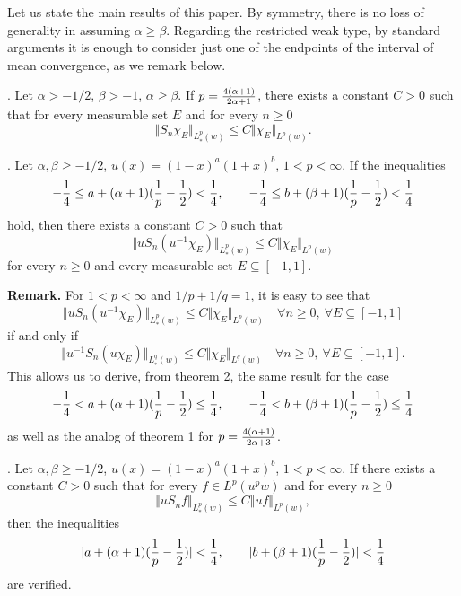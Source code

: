 Let us state the main results of this paper. By symmetry, there is no loss of
generality in assuming $\alpha \geq \beta$. Regarding the restricted weak
type, by standard arguments it is enough to consider just one of the endpoints
of the interval of mean convergence, as we remark below.

. Let $\alpha > -1/2$, $\beta > -1$, $\alpha \geq \beta$. If
$p = {4(\alpha+1) \over 2\alpha+1}$, there exists a constant $C>0$ such that
for every measurable set $E$ and for every $n \geq 0$
$$
   \Vert S_n\chi_E \Vert _{L^p_*(w)} \leq	 C \Vert \chi_E \Vert _{L^p(w)}.
$$

\medskip

. Let $\alpha, \beta \geq -1/2$, $u(x)=(1-x)^a(1+x)^b$,
$1<p<\infty$. If the inequalities
$$
   -{1 \over 4} \leq a+(\alpha+1)({1 \over p}-{1 \over 2}) < {1 \over 4},
   \qquad
   -{1 \over 4} \leq b+(\beta+1)({1 \over p}-{1 \over 2}) < {1 \over 4}
$$
hold, then there exists a constant $C>0$ such that
$$
   \Vert uS_n(u^{-1}\chi_E) \Vert _{L^p_*(w)}
   \leq C \Vert \chi_E \Vert _{L^p(w)}
$$
for every $n \geq 0$ and every measurable set $E \subseteq [-1,1]$.

\medskip

{\noindent\bf Remark.} For $1<p<\infty$ and $1/p+1/q=1$, it is easy to see that
$$
   \Vert uS_n(u^{-1}\chi_E) \Vert _{L^p_*(w)}
   \leq C \Vert \chi_E \Vert _{L^p(w)}
   \quad \forall n\geq 0, \ \forall E \subseteq [-1,1]
$$
if and only if
$$
   \Vert u^{-1}S_n(u\chi_E) \Vert _{L^q_*(w)}
   \leq C \Vert \chi_E \Vert _{L^q(w)}
   \quad \forall n\geq 0, \ \forall E \subseteq [-1,1].
$$
This allows us to derive, from theorem 2, the same result for the case
$$
   -{1 \over 4} < a+(\alpha+1)({1 \over p}-{1 \over 2}) \leq {1 \over 4},
   \qquad
   -{1 \over 4} < b+(\beta+1)({1 \over p}-{1 \over 2}) \leq {1 \over 4}
$$
as well as the analog of theorem 1 for $p={4(\alpha+1) \over 2\alpha+3}$.

\medskip

. Let $\alpha, \beta \geq -1/2$, $u(x)=(1-x)^a(1+x)^b$,
$1<p<\infty$. If there exists a constant $C>0$ such that for every $f \in
L^p(u^pw)$ and for every $n \geq 0$
$$
   \Vert uS_nf \Vert _{L^p_*(w)} \leq	 C \Vert uf \Vert _{L^p(w)},
$$
then the inequalities
$$
   \vert a+(\alpha+1)({1 \over p}-{1 \over 2}) \vert < {1 \over 4}, \qquad
   \vert b+(\beta+1) ({1 \over p}-{1 \over 2}) \vert < {1 \over 4}
$$
are verified.

\bigskip

